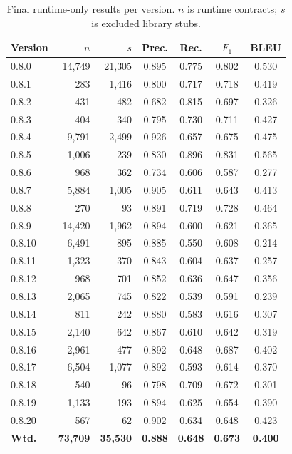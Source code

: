 \documentclass{stylefiles/capstone}
\begin{document}
\begin{table}[t]
\centering
\caption{Final runtime-only results per version. $n$ is runtime contracts; $s$ is
excluded library stubs.}
\label{tab:perversion}
\scriptsize
\begin{tabular}{l r r c c c c}
\toprule
Version & $n$ & $s$ & Prec. & Rec. & $F_1$ & BLEU \\
\midrule
0.8.0  & 14{,}749 & 21{,}305 & 0.895 & 0.775 & 0.802 & 0.530 \\
0.8.1  & 283      & 1{,}416  & 0.800 & 0.717 & 0.718 & 0.419 \\
0.8.2  & 431      & 482      & 0.682 & 0.815 & 0.697 & 0.326 \\
0.8.3  & 404      & 340      & 0.795 & 0.730 & 0.711 & 0.427 \\
0.8.4  & 9{,}791  & 2{,}499  & 0.926 & 0.657 & 0.675 & 0.475 \\
0.8.5  & 1{,}006  & 239      & 0.830 & 0.896 & 0.831 & 0.565 \\
0.8.6  & 968      & 362      & 0.734 & 0.606 & 0.587 & 0.277 \\
0.8.7  & 5{,}884  & 1{,}005  & 0.905 & 0.611 & 0.643 & 0.413 \\
0.8.8  & 270      & 93       & 0.891 & 0.719 & 0.728 & 0.464 \\
0.8.9  & 14{,}420 & 1{,}962  & 0.894 & 0.600 & 0.621 & 0.365 \\
0.8.10 & 6{,}491  & 895      & 0.885 & 0.550 & 0.608 & 0.214 \\
0.8.11 & 1{,}323  & 370      & 0.843 & 0.604 & 0.637 & 0.257 \\
0.8.12 & 968      & 701      & 0.852 & 0.636 & 0.647 & 0.356 \\
0.8.13 & 2{,}065  & 745      & 0.822 & 0.539 & 0.591 & 0.239 \\
0.8.14 & 811      & 242      & 0.880 & 0.583 & 0.616 & 0.307 \\
0.8.15 & 2{,}140  & 642      & 0.867 & 0.610 & 0.642 & 0.319 \\
0.8.16 & 2{,}961  & 477      & 0.892 & 0.648 & 0.687 & 0.402 \\
0.8.17 & 6{,}504  & 1{,}077  & 0.892 & 0.593 & 0.614 & 0.370 \\
0.8.18 & 540      & 96       & 0.798 & 0.709 & 0.672 & 0.301 \\
0.8.19 & 1{,}133  & 193      & 0.894 & 0.625 & 0.654 & 0.390 \\
0.8.20 & 567      & 62       & 0.902 & 0.634 & 0.648 & 0.423 \\
\midrule
\textbf{Wtd.} & \textbf{73{,}709} & \textbf{35{,}530} & \textbf{0.888} & \textbf{0.648} & \textbf{0.673} & \textbf{0.400} \\
\bottomrule
\end{tabular}
\end{table}
\end{document}
